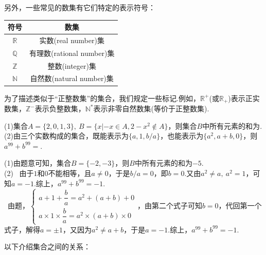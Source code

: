 \documentclass[lang=cn, zihao=5]{elegantbook}
\newcommand{\R}{\mathbb{R}}
\newcommand{\sw}[1]{\boxed{\text{解法 #1}} \ }
\newcommand{\tk}{\uline{\hspace{4em}}}
\begin{document}
另外，一些常见的数集有它们特定的表示符号：

\begin{table}[h]
	\centering
	\renewcommand\arraystretch{1.3}
	\begin{tabular}{cc}
		\toprule
		符号           & 数集                    \\
		\midrule
		$\R$         & 实数(real number)集      \\
		$\mathbb{Q}$ & 有理数(rational number)集 \\
		$\mathbb{Z}$ & 整数(integer)集          \\
		$\mathbb{N}$ & 自然数(natural number)集 \\
		\bottomrule
	\end{tabular}
\end{table}

为了描述类似于“正整数集”的集合，我们规定一些标记.例如，$\R ^{+}$(或$\R _{+}$)表示正实数集，$\mathbb{Z}^{-}$表示负整数集，$\mathbb{N}^{*}$表示非零自然数集(等价于正整数集).

\begin{example}
	(1)集合$A=\{ 2,0,1,3 \},~B = \{ x|-x \in A,2-x^2 \notin A \}$，则集合$B$中所有元素的和为\tk . \\
	(2)由三个实数构成的集合，既能表示为$\{ a,1,b/a \}$，也能表示为$\{ a^2,a+b,0 \}$，则$a^{99}+b^{99}=$\tk . \\
\end{example}
\begin{solution}
	(1)由题意可知，集合$B=\{ -2,-3 \}$，则$B$中所有元素的和为$-5$. \\
	(2)\sw{一}由于$1$和$0$不能相等，且$a \neq 0$，于是$b/a=0$，即$b=0$.又由$a^2 \neq a,~a^2=1$，可知$a=-1$.综上，$a^{99}+b^{99}=-1$. \\
	\sw{二}由题，$\begin{cases}
		a+1+\dfrac{b}{a} = a^2+(a+b) + 0 \\ a \times 1 \times \dfrac{b}{a} = a^2 \times (a+b) \times 0
	\end{cases}$，由第二个式子可知$b=0$，代回第一个式子，解得$a= \pm 1$，又因为$a^2 \neq a+b$，于是$a=-1$.综上，$a^{99}+b^{99}=-1$.
\end{solution}

以下介绍集合之间的关系：
\end{document}
